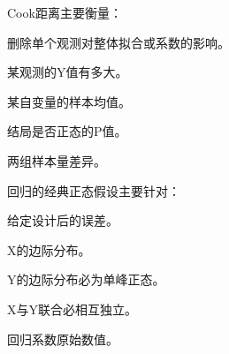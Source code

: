 \par\addvspace{6pt}\noindent\begin{minipage}{\linewidth}


Cook距离主要衡量：


\begin{choices}

\item 删除单个观测对整体拟合或系数的影响。

\item 某观测的Y值有多大。

\item 某自变量的样本均值。

\item 结局是否正态的P值。

\item 两组样本量差异。

\end{choices}

\end{minipage}\par\vspace{4pt}

\par\addvspace{6pt}\noindent\begin{minipage}{\linewidth}


回归的经典正态假设主要针对：


\begin{choices}

\item 给定设计后的误差。

\item X的边际分布。

\item Y的边际分布必为单峰正态。

\item X与Y联合必相互独立。

\item 回归系数原始数值。

\end{choices}

\end{minipage}\par\vspace{4pt}

